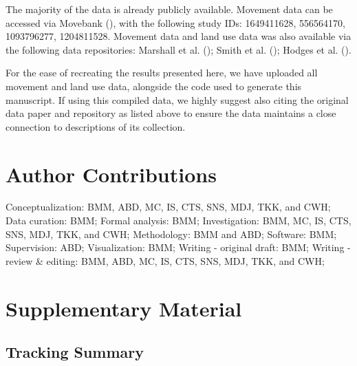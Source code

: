 \documentclass[10pt,a4paper]{article}
\begin{document}
The majority of the data is already publicly available.
Movement data can be accessed via Movebank (), with the following study IDs: 1649411628, 556564170, 1093796277, 1204811528.
Movement data and land use data was also available via the following data repositories: Marshall et al. (); Smith et al. (); Hodges et al. ().

For the ease of recreating the results presented here, we have uploaded all movement and land use data, alongside the code used to generate this manuscript.
If using this compiled data, we highly suggest also citing the original data paper and repository as listed above to ensure the data maintains a close connection to descriptions of its collection.

\section{Author Contributions}\label{author-contributions}

Conceptualization: BMM, ABD, MC, IS, CTS, SNS, MDJ, TKK, and CWH;
Data curation: BMM;
Formal analysis: BMM;
Investigation: BMM, MC, IS, CTS, SNS, MDJ, TKK, and CWH;
Methodology: BMM and ABD;
Software: BMM;
Supervision: ABD;
Visualization: BMM;
Writing - original draft: BMM;
Writing - review \& editing: BMM, ABD, MC, IS, CTS, SNS, MDJ, TKK, and CWH;

\section{Supplementary Material}\label{supplementary-material}

\subsection{Tracking Summary}\label{tracking-summary-1}
\end{document}
